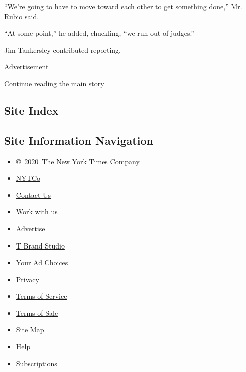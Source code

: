 ``We're going to have to move toward each other to get something done,''
Mr. Rubio said.

``At some point,'' he added, chuckling, ``we run out of judges.''

Jim Tankersley contributed reporting.

Advertisement

\protect\hyperlink{after-bottom}{Continue reading the main story}

\hypertarget{site-index}{%
\subsection{Site Index}\label{site-index}}

\hypertarget{site-information-navigation}{%
\subsection{Site Information
Navigation}\label{site-information-navigation}}

\begin{itemize}
\tightlist
\item
  \href{https://help.nytimes3xbfgragh.onion/hc/en-us/articles/115014792127-Copyright-notice}{©~2020~The
  New York Times Company}
\end{itemize}

\begin{itemize}
\tightlist
\item
  \href{https://www.nytco.com/}{NYTCo}
\item
  \href{https://help.nytimes3xbfgragh.onion/hc/en-us/articles/115015385887-Contact-Us}{Contact
  Us}
\item
  \href{https://www.nytco.com/careers/}{Work with us}
\item
  \href{https://nytmediakit.com/}{Advertise}
\item
  \href{http://www.tbrandstudio.com/}{T Brand Studio}
\item
  \href{https://www.nytimes3xbfgragh.onion/privacy/cookie-policy\#how-do-i-manage-trackers}{Your
  Ad Choices}
\item
  \href{https://www.nytimes3xbfgragh.onion/privacy}{Privacy}
\item
  \href{https://help.nytimes3xbfgragh.onion/hc/en-us/articles/115014893428-Terms-of-service}{Terms
  of Service}
\item
  \href{https://help.nytimes3xbfgragh.onion/hc/en-us/articles/115014893968-Terms-of-sale}{Terms
  of Sale}
\item
  \href{https://spiderbites.nytimes3xbfgragh.onion}{Site Map}
\item
  \href{https://help.nytimes3xbfgragh.onion/hc/en-us}{Help}
\item
  \href{https://www.nytimes3xbfgragh.onion/subscription?campaignId=37WXW}{Subscriptions}
\end{itemize}
